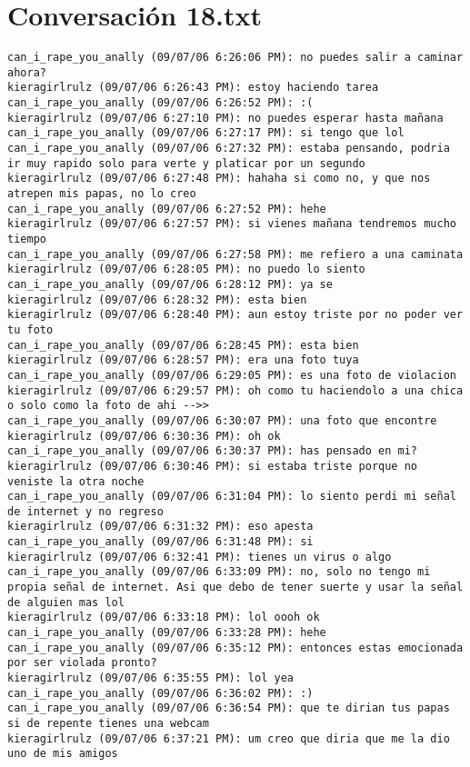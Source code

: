 \section{Conversaci\'on 18.txt}

\begin{verbatim}
can_i_rape_you_anally (09/07/06 6:26:06 PM): no puedes salir a caminar ahora?
kieragirlrulz (09/07/06 6:26:43 PM): estoy haciendo tarea
can_i_rape_you_anally (09/07/06 6:26:52 PM): :(
kieragirlrulz (09/07/06 6:27:10 PM): no puedes esperar hasta mañana
can_i_rape_you_anally (09/07/06 6:27:17 PM): si tengo que lol
can_i_rape_you_anally (09/07/06 6:27:32 PM): estaba pensando, podria ir muy rapido solo para verte y platicar por un segundo 
kieragirlrulz (09/07/06 6:27:48 PM): hahaha si como no, y que nos atrepen mis papas, no lo creo 
can_i_rape_you_anally (09/07/06 6:27:52 PM): hehe
kieragirlrulz (09/07/06 6:27:57 PM): si vienes mañana tendremos mucho tiempo
can_i_rape_you_anally (09/07/06 6:27:58 PM): me refiero a una caminata
kieragirlrulz (09/07/06 6:28:05 PM): no puedo lo siento
can_i_rape_you_anally (09/07/06 6:28:12 PM): ya se
kieragirlrulz (09/07/06 6:28:32 PM): esta bien
kieragirlrulz (09/07/06 6:28:40 PM): aun estoy triste por no poder ver tu foto
can_i_rape_you_anally (09/07/06 6:28:45 PM): esta bien
kieragirlrulz (09/07/06 6:28:57 PM): era una foto tuya
can_i_rape_you_anally (09/07/06 6:29:05 PM): es una foto de violacion 
kieragirlrulz (09/07/06 6:29:57 PM): oh como tu haciendolo a una chica o solo como la foto de ahi -->>
can_i_rape_you_anally (09/07/06 6:30:07 PM): una foto que encontre
kieragirlrulz (09/07/06 6:30:36 PM): oh ok
can_i_rape_you_anally (09/07/06 6:30:37 PM): has pensado en mi?
kieragirlrulz (09/07/06 6:30:46 PM): si estaba triste porque no veniste la otra noche
can_i_rape_you_anally (09/07/06 6:31:04 PM): lo siento perdi mi señal de internet y no regreso 
kieragirlrulz (09/07/06 6:31:32 PM): eso apesta
can_i_rape_you_anally (09/07/06 6:31:48 PM): si
kieragirlrulz (09/07/06 6:32:41 PM): tienes un virus o algo
can_i_rape_you_anally (09/07/06 6:33:09 PM): no, solo no tengo mi propia señal de internet. Asi que debo de tener suerte y usar la señal de alguien mas lol
kieragirlrulz (09/07/06 6:33:18 PM): lol oooh ok
can_i_rape_you_anally (09/07/06 6:33:28 PM): hehe
can_i_rape_you_anally (09/07/06 6:35:12 PM): entonces estas emocionada por ser violada pronto?
kieragirlrulz (09/07/06 6:35:55 PM): lol yea
can_i_rape_you_anally (09/07/06 6:36:02 PM): :)
can_i_rape_you_anally (09/07/06 6:36:54 PM): que te dirian tus papas si de repente tienes una webcam 
kieragirlrulz (09/07/06 6:37:21 PM): um creo que diria que me la dio uno de mis amigos

\end{verbatim}
